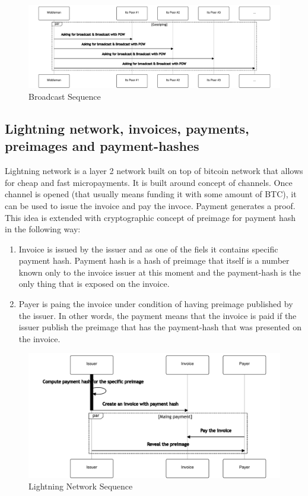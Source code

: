 \documentclass{article}
\begin{document}
\begin{figure}
	\centering
	\includegraphics[scale=0.5]{BroadcastSequence.pdf}
	\caption{Broadcast Sequence}
	\label{fig:fr:broadcastsequence}
\end{figure}

\subsection{Lightning network, invoices, payments, preimages and payment-hashes}

Lightning network is a layer 2 network built on top of bitcoin network that allows for cheap and fast micropayments.
It is built around concept of channels. Once channel is opened (that usually means funding it with some amount of BTC), it can be used to issue the invoice and pay the invoce. Payment generates a proof. This idea is extended with cryptographic concept of preimage for payment hash in the following way:
\begin{enumerate}
	\item Invoice is issued by the issuer and as one of the fiels it contains specific payment hash. Payment hash is a hash of preimage that itself is a number known only to the invoice issuer at this moment and the payment-hash is the only thing that is exposed on the invoice.
	\item Payer is paing the invoice under condition of having preimage published by the issuer. In other words, the payment means that the invoice is paid if the issuer publish the preimage that has the payment-hash that was presented on the invoice.
\end{enumerate}

\begin{figure}
	\centering
	\includegraphics[scale=0.5]{LNDSequence.pdf}
	\caption{Lightning Network Sequence}
	\label{fig:fr:lndsequence}
\end{figure}
\end{document}
